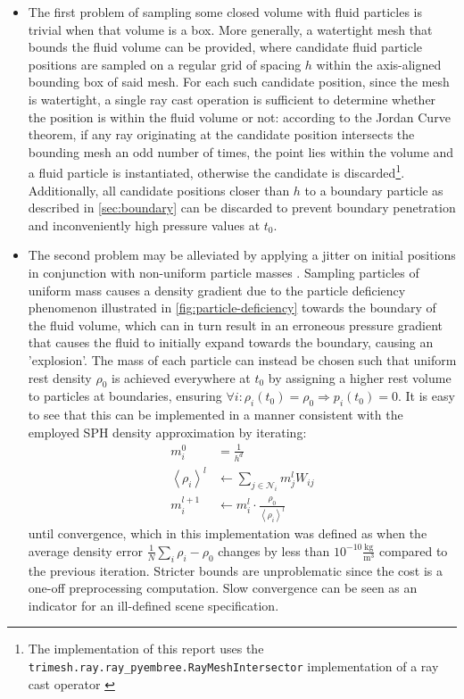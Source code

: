 \documentclass[oneside, a4paper]{book}
\newcommand\angled[1]{\left\langle#1\right\rangle}
\begin{document}
    \begin{itemize}
      \item  The first problem of sampling some closed volume with fluid particles is trivial when that volume is a box. More generally, a watertight mesh that bounds the fluid volume can be provided, where candidate fluid particle positions are sampled on a regular grid of spacing $h$ within the axis-aligned bounding box of said mesh. For each such candidate position, since the mesh is watertight, a single ray cast operation is sufficient to determine whether the position is within the fluid volume or not: according to the Jordan Curve theorem, if any ray originating at the candidate position intersects the bounding mesh an odd number of times, the point lies within the volume \autocite{point-in-polygon} and a fluid particle is instantiated, otherwise the candidate is discarded\footnote{The implementation of this report uses the \texttt{trimesh.ray.ray\_pyembree.RayMeshIntersector} implementation of a ray cast operator \autocite{trimesh}}. Additionally, all candidate positions closer than $h$ to a boundary particle as described in \autoref{sec:boundary} can be discarded to prevent boundary penetration and inconveniently high pressure values at $t_0$.
      \item The second problem may be alleviated by applying a jitter on initial positions in conjunction with non-uniform particle masses \autocite{labcourse}. Sampling particles of uniform mass causes a density gradient due to the particle deficiency phenomenon illustrated in \autoref{fig:particle-deficiency} towards the boundary of the fluid volume, which can in turn result in an erroneous pressure gradient that causes the fluid to initially expand towards the boundary, causing an 'explosion'. The mass of each particle can instead be chosen such that uniform rest density $\rho_0$ is achieved everywhere at $t_0$ by assigning a higher rest volume to particles at boundaries, ensuring $\forall i: \rho_i(t_0)=\rho_0\Longrightarrow p_i(t_0)=0$. It is easy to see that this can be implemented in a manner consistent with the employed SPH density approximation by iterating:
      \begin{align}
        m_i^0 &= \frac{1}{h^d}\\
        \angled{\rho_i}^l &\gets \sum_{j\in\mathcal{N}_i} m_j^l W_{ij} \\
        m_i^{l+1} &\gets m_i^l \cdot \frac{\rho_0}{\angled{\rho_i}^l}\label{eq:initializing-fluid-rest-density}
      \end{align}
      until convergence, which in this implementation was defined as when the average density error $\frac{1}{N}\sum_{i}\rho_i - \rho_0$ changes by less than $10^{-10}\frac{\si{\kg}}{\si{\meter}^3}$ compared to the previous iteration. Stricter bounds are unproblematic since the cost is a one-off preprocessing computation. Slow convergence can be seen as an indicator for an ill-defined scene specification. 


\end{itemize}
\end{document}
